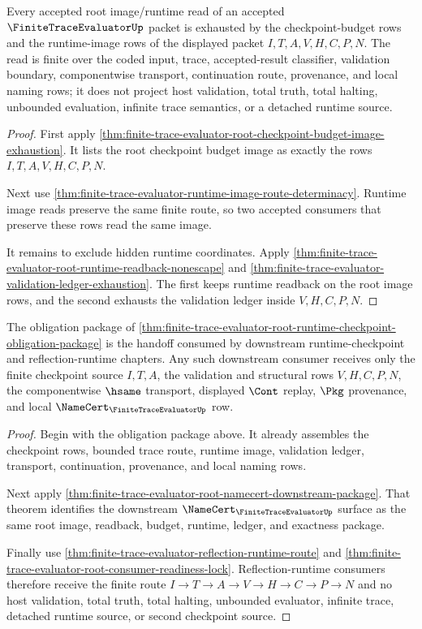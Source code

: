 \begin{theorem}
\label{thm:finite-trace-evaluator-root-image-runtime-totality}
Every accepted root image/runtime read of an accepted $\FiniteTraceEvaluatorUp$ packet is exhausted by the checkpoint-budget rows and the runtime-image rows of the displayed packet $I,T,A,V,H,C,P,N$. The read is finite over the coded input, trace, accepted-result classifier, validation boundary, componentwise transport, continuation route, provenance, and local naming rows; it does not project host validation, total truth, total halting, unbounded evaluation, infinite trace semantics, or a detached runtime source.
\end{theorem}
\begin{proof}
First apply \autoref{thm:finite-trace-evaluator-root-checkpoint-budget-image-exhaustion}. It lists the root checkpoint budget image as exactly the rows $I,T,A,V,H,C,P,N$.

Next use \autoref{thm:finite-trace-evaluator-runtime-image-route-determinacy}. Runtime image reads preserve the same finite route, so two accepted consumers that preserve these rows read the same image.

It remains to exclude hidden runtime coordinates. Apply \autoref{thm:finite-trace-evaluator-root-runtime-readback-nonescape} and \autoref{thm:finite-trace-evaluator-validation-ledger-exhaustion}. The first keeps runtime readback on the root image rows, and the second exhausts the validation ledger inside $V,H,C,P,N$.
\end{proof}

\begin{theorem}
\label{thm:finite-trace-evaluator-root-namecert-readiness-handoff}
The obligation package of \autoref{thm:finite-trace-evaluator-root-runtime-checkpoint-obligation-package} is the handoff consumed by downstream runtime-checkpoint and reflection-runtime chapters. Any such downstream consumer receives only the finite checkpoint source $I,T,A$, the validation and structural rows $V,H,C,P,N$, the componentwise $\hsame$ transport, displayed $\Cont$ replay, $\Pkg$ provenance, and local $\NameCert_{\FiniteTraceEvaluatorUp}$ row.
\end{theorem}
\begin{proof}
Begin with the obligation package above. It already assembles the checkpoint rows, bounded trace route, runtime image, validation ledger, transport, continuation, provenance, and local naming rows.

Next apply \autoref{thm:finite-trace-evaluator-root-namecert-downstream-package}. That theorem identifies the downstream $\NameCert_{\FiniteTraceEvaluatorUp}$ surface as the same root image, readback, budget, runtime, ledger, and exactness package.

Finally use \autoref{thm:finite-trace-evaluator-reflection-runtime-route} and \autoref{thm:finite-trace-evaluator-root-consumer-readiness-lock}. Reflection-runtime consumers therefore receive the finite route $I \to T \to A \to V \to H \to C \to P \to N$ and no host validation, total truth, total halting, unbounded evaluator, infinite trace, detached runtime source, or second checkpoint source.
\end{proof}
